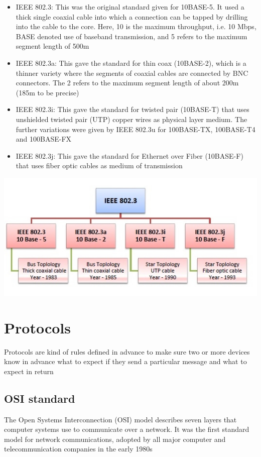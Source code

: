 \documentclass[a4paper,12pt]{article}
\begin{document}
\begin{itemize}
\item{IEEE 802.3: This was the original standard given for 10BASE-5. It used a thick single coaxial cable into which a connection can be tapped by drilling into the cable to the core. Here, 10 is the maximum throughput, i.e. 10 Mbps, BASE denoted use of baseband transmission, and 5 refers to the maximum segment length of 500m}
\item{IEEE 802.3a: This gave the standard for thin coax (10BASE-2), which is a thinner variety where the segments of coaxial cables are connected by BNC connectors. The 2 refers to the maximum segment length of about 200m (185m to be precise)}
\item{IEEE 802.3i: This gave the standard for twisted pair (10BASE-T) that uses unshielded twisted pair (UTP) copper wires as physical layer medium. The further variations were given by IEEE 802.3u for 100BASE-TX, 100BASE-T4 and 100BASE-FX}
\item{IEEE 802.3j: This gave the standard for Ethernet over Fiber (10BASE-F) that uses fiber optic cables as medium of transmission}
\end{itemize}
\includegraphics[width=15cm]{./ieee_802.jpg}

\section{Protocols}

Protocols are kind of rules defined in advance to make sure two or more devices know in advance what to expect if they send a particular message and what to expect in return 

\subsection{OSI standard}
The Open Systems Interconnection (OSI) model describes seven layers that computer systems use to communicate over a network. It was the first standard model for network communications, adopted by all major computer and telecommunication companies in the early 1980s
\end{document}
